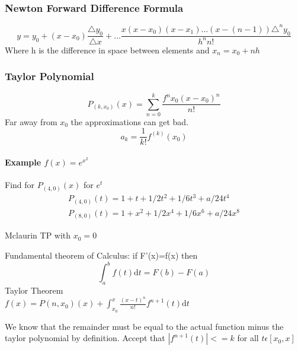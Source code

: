 \documentclass{article}
\begin{document}
\subsubsection{Newton Forward Difference Formula}
\begin{equation}
y=y_0+(x-x_0)\frac{\triangle y_0}{\triangle x}+ \dots \frac{x(x-x_0)(x-x_1)...(x-(n-1))\triangle^n y_0}{h^n n!}
\end{equation}
Where h is the difference in space between elements and $x_n=x_0+nh$
\subsubsection{Taylor Polynomial}
\begin{equation}
P_(k,x_0)(x)=\sum\limits_{n=0}^k \frac{f^n x_0(x-x_0)^n}{n!}
\end{equation} 
Far away from $x_0$ the approximations can get bad.
\begin{equation}
a_k=\frac{1}{k!} f^{(k)}(x_0)
\end{equation}
\paragraph{Example $f(x)=e^{x^2}$}
Find for $P_{(4,0)}(x)$ for $e^t$\newline
\begin{align}
P_{(4,0)}(t)=1+t+1/2t^2+1/6t^3+a/24t^4\\
P_{(8,0)}(t)=1+x^2+1/2x^4+1/6x^6+a/24x^8
\end{align}

Mclaurin TP with $x_0=0$



Fundamental theorem of Calculus: if F'(x)=f(x) 
then\\
\begin{equation}
\int_a^b f(t) \mathrm{d}t=F(b)-F(a)
\end{equation}
Taylor Theorem\\
$f(x)=P{(n,x_0)}(x)+\int_{x_0}^x \frac{(x-t)^n}{n!} f^{n+1}(t) \mathrm{d}t$

We know that the remainder must be equal to the actual function minus the taylor polynomial by definition. 
Accept that $|f^{n+1}(t)|<=k$ for all $t \epsilon [x_0,x]$
\end{document}
